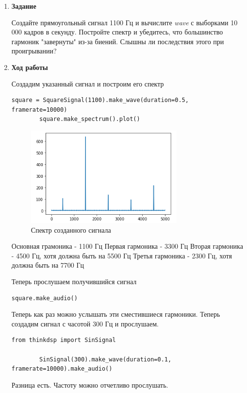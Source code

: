 \documentclass[a4paper,12pt]{article}
\begin{document}
\begin{enumerate}
	
	\item \textbf{Задание}
	
	Создайте прямоугольный сигнал 1100 Гц и вычислите \textit{wave} с выборками 10 000 кадров в секунду. Постройте спектр и убедитесь, что большинство гармоник "завернуты" из-за биений. Слышны ли последствия этого при проигрывании?
	
	\item \textbf{Ход работы}
	
	
	Создадим указанный сигнал и построим его спектр
	\begin{lstlisting}[caption=Создание сигнала и его спектра]
		square = SquareSignal(1100).make_wave(duration=0.5, framerate=10000)
		square.make_spectrum().plot()
	\end{lstlisting}
	\begin{figure}[H]
		\centering
		\includegraphics[width=0.75\textwidth]{3_1.png}
		\caption{Спектр созданного сигнала}
		\label{fig:3.1}
	\end{figure}
	Основная грамоника - 1100 Гц
	Первая гармоника - 3300 Гц
	Вторая гармоника - 4500 Гц, хотя должна быть на 5500 Гц
	Третья гармоника - 2300 Гц, хотя должна быть на 7700 Гц
	
	Теперь прослушаем получившийся сигнал 
	\begin{lstlisting}[caption=Прослушивание сигнала]
		square.make_audio()
	\end{lstlisting}
	
	Теперь как раз можно услышать эти сместившиеся гармоники.
	Теперь создадим сигнал с часотой 300 Гц и прослушаем.
	
	\begin{lstlisting}[caption=Создание сигнала с частотой 300 Гц и его прослушивание]
		from thinkdsp import SinSignal
		
		SinSignal(300).make_wave(duration=0.1, framerate=10000).make_audio()
	\end{lstlisting}
	
	Разница есть. Частоту можно отчетливо прослушать.
	
\end{enumerate}
\end{document}
